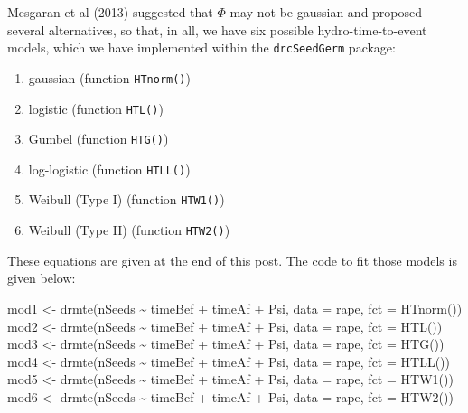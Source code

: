 \documentclass[
]{book}
\newenvironment{Shaded}{\begin{snugshade}}{\end{snugshade}}
\newcommand{\AttributeTok}[1]{\textcolor[rgb]{0.77,0.63,0.00}{#1}}
\newcommand{\FunctionTok}[1]{\textcolor[rgb]{0.00,0.00,0.00}{#1}}
\newcommand{\NormalTok}[1]{#1}
\newcommand{\OtherTok}[1]{\textcolor[rgb]{0.56,0.35,0.01}{#1}}
\newcommand{\SpecialCharTok}[1]{\textcolor[rgb]{0.00,0.00,0.00}{#1}}
\providecommand{\tightlist}{%
  \setlength{\itemsep}{0pt}\setlength{\parskip}{0pt}}
\begin{document}
Mesgaran et al (2013) suggested that \(\Phi\) may not be gaussian and proposed several alternatives, so that, in all, we have six possible hydro-time-to-event models, which we have implemented within the \texttt{drcSeedGerm} package:

\begin{enumerate}
\def\labelenumi{\arabic{enumi}.}
\tightlist
\item
  gaussian (function \texttt{HTnorm()})
\item
  logistic (function \texttt{HTL()})
\item
  Gumbel (function \texttt{HTG()})
\item
  log-logistic (function \texttt{HTLL()})
\item
  Weibull (Type I) (function \texttt{HTW1()})
\item
  Weibull (Type II) (function \texttt{HTW2()})
\end{enumerate}

These equations are given at the end of this post. The code to fit those models is given below:

\begin{Shaded}
\begin{Highlighting}[]
\NormalTok{mod1 }\OtherTok{\textless{}{-}} \FunctionTok{drmte}\NormalTok{(nSeeds }\SpecialCharTok{\textasciitilde{}}\NormalTok{ timeBef }\SpecialCharTok{+}\NormalTok{ timeAf }\SpecialCharTok{+}\NormalTok{ Psi, }
              \AttributeTok{data =}\NormalTok{ rape, }\AttributeTok{fct =} \FunctionTok{HTnorm}\NormalTok{())}
\NormalTok{mod2 }\OtherTok{\textless{}{-}} \FunctionTok{drmte}\NormalTok{(nSeeds }\SpecialCharTok{\textasciitilde{}}\NormalTok{ timeBef }\SpecialCharTok{+}\NormalTok{ timeAf }\SpecialCharTok{+}\NormalTok{ Psi,}
              \AttributeTok{data =}\NormalTok{ rape, }\AttributeTok{fct =} \FunctionTok{HTL}\NormalTok{())}
\NormalTok{mod3 }\OtherTok{\textless{}{-}} \FunctionTok{drmte}\NormalTok{(nSeeds }\SpecialCharTok{\textasciitilde{}}\NormalTok{ timeBef }\SpecialCharTok{+}\NormalTok{ timeAf }\SpecialCharTok{+}\NormalTok{ Psi,}
              \AttributeTok{data =}\NormalTok{ rape, }\AttributeTok{fct =} \FunctionTok{HTG}\NormalTok{())}
\NormalTok{mod4 }\OtherTok{\textless{}{-}} \FunctionTok{drmte}\NormalTok{(nSeeds }\SpecialCharTok{\textasciitilde{}}\NormalTok{ timeBef }\SpecialCharTok{+}\NormalTok{ timeAf }\SpecialCharTok{+}\NormalTok{ Psi,}
            \AttributeTok{data =}\NormalTok{ rape, }\AttributeTok{fct =} \FunctionTok{HTLL}\NormalTok{())}
\NormalTok{mod5 }\OtherTok{\textless{}{-}} \FunctionTok{drmte}\NormalTok{(nSeeds }\SpecialCharTok{\textasciitilde{}}\NormalTok{ timeBef }\SpecialCharTok{+}\NormalTok{ timeAf }\SpecialCharTok{+}\NormalTok{ Psi,}
            \AttributeTok{data =}\NormalTok{ rape, }\AttributeTok{fct =} \FunctionTok{HTW1}\NormalTok{())}
\NormalTok{mod6 }\OtherTok{\textless{}{-}} \FunctionTok{drmte}\NormalTok{(nSeeds }\SpecialCharTok{\textasciitilde{}}\NormalTok{ timeBef }\SpecialCharTok{+}\NormalTok{ timeAf }\SpecialCharTok{+}\NormalTok{ Psi,}
            \AttributeTok{data =}\NormalTok{ rape, }\AttributeTok{fct =} \FunctionTok{HTW2}\NormalTok{())}
\end{Highlighting}
\end{Shaded}
\end{document}
